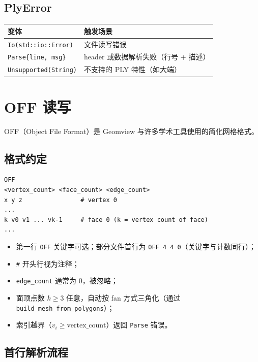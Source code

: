 \documentclass[11pt,a4paper]{article}
\begin{document}
\subsection{PlyError}

\begin{center}
\renewcommand{\arraystretch}{1.18}
\begin{tabular}{@{}ll@{}}
  \toprule
  \textbf{变体} & \textbf{触发场景} \\
  \midrule
  \texttt{Io(std::io::Error)}     & 文件读写错误 \\
  \texttt{Parse\{line, msg\}}     & header 或数据解析失败（行号 + 描述） \\
  \texttt{Unsupported(String)}    & 不支持的 PLY 特性（如大端） \\
  \bottomrule
\end{tabular}
\end{center}

\section{OFF 读写}

OFF（Object File Format）是 Geomview 与许多学术工具使用的简化网格格式。

\subsection{格式约定}

\begin{lstlisting}
OFF
<vertex_count> <face_count> <edge_count>
x y z                # vertex 0
...
k v0 v1 ... vk-1     # face 0 (k = vertex count of face)
...
\end{lstlisting}

\begin{itemize}
  \item 第一行 \texttt{OFF} 关键字可选；部分文件首行为 \texttt{OFF 4 4 0}（关键字与计数同行）；
  \item \texttt{\#} 开头行视为注释；
  \item \texttt{edge\_count} 通常为 0，被忽略；
  \item 面顶点数 $k \ge 3$ 任意，自动按 fan 方式三角化（通过
        \texttt{build\_mesh\_from\_polygons}）；
  \item 索引越界（$v_i \ge \text{vertex\_count}$）返回 \texttt{Parse} 错误。
\end{itemize}

\subsection{首行解析流程}
\end{document}
